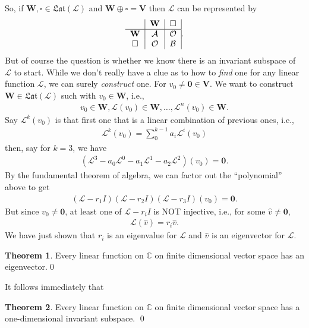 \documentclass{article}
\theoremstyle{definition}
\newtheorem{thm}{Theorem}[section]
\newcommand{\V}{\mathbf{V}}
\newcommand{\W}{\mathbf{W}}
\newcommand{\lag}{\mathcal{L}}
\begin{document}
So, if $\W, \square \in \mathfrak{Lat}(\lag)$ and $\W \oplus \square = \V$ then $\lag$ can be represented by
\begin{align*}
\begin{tabular}{c|c|c|}
& $\W$ & $\square$\\
\hline
$\W$& $\mathcal{A}$ & $\mathcal{O}$ \\	
$\square$& $\mathcal{O}$  & $\mathcal{B}$ 
\end{tabular}.
\end{align*}
But of course the question is whether we know there is an invariant subspace of $\lag$ to start. While we don't really have a clue as to how to \textit{find} one for any linear function $\lag$, we can surely \textit{construct} one. For $v_0 \neq \mathbf{0} \in \V$. We want to construct $\W \in \mathfrak{Lat}(\lag)$ such with $v_0 \in \W$, i.e.,
\begin{align*}
v_0 \in \W, \lag(v_0) \in \W, \dots, \lag^n(v_0) \in \W.
\end{align*}
Say $\lag^k(v_0)$ is that first one that is a linear combination of previous ones, i.e.,
\begin{align*}
\lag^k(v_0) = \sum^{k-1}_{0} a_i \lag^i (v_0)
\end{align*}
then, say for $k = 3$, we have
\begin{align*}
\left(\lag^3 - a_0 \lag^0 - a_1 \lag^1 - a_2 \lag^2 \right)(v_0) = \mathbf{0}.
\end{align*}
By the fundamental theorem of algebra, we can factor out the ``polynomial'' above to get
\begin{align*}
(\lag - r_1 I)(\lag - r_2 I)(\lag - r_3 I)(v_0) = \mathbf{0}.
\end{align*}
But since $v_0 \neq \mathbf{0}$, at least one of $\lag - r_i I$ is NOT injective, i.e., for some $\hat{v} \neq \mathbf{0}$, 
\begin{align*}
\lag(\hat{v}) = r_i \hat{v}.
\end{align*} 
We have just shown that $r_i$ is an eigenvalue for $\lag$ and $\hat{v}$ is an eigenvector for $\lag$. 

\begin{thm}
	Every linear function on $\mathbb{C}$ on finite dimensional vector space has an eigenvector.\qed
\end{thm}

It follows immediately that
\begin{thm}
	Every linear function on $\mathbb{C}$ on finite dimensional vector space has a one-dimensional invariant subspace. \qed
\end{thm}
\end{document}
